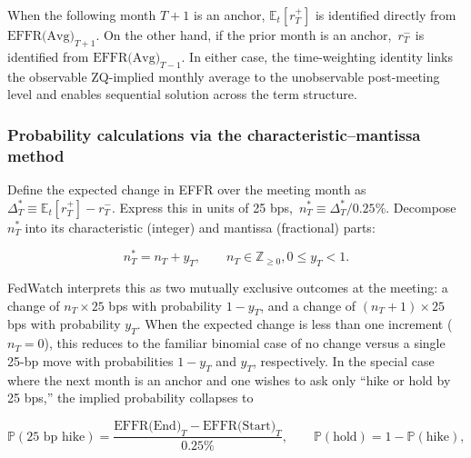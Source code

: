 When the following month $T{+}1$ is an anchor, $\mathbb{E}_t[r_T^{+}]$ is identified directly from $\text{EFFR(Avg)}_{T+1}$. On the other hand, if the prior month is an anchor, $\,r_T^{-}$ is identified from $\text{EFFR(Avg)}_{T-1}$. In either case, the time-weighting identity links the observable ZQ-implied monthly average to the unobservable post-meeting level and enables sequential solution across the term structure. 

\subsubsection{Probability calculations via the characteristic–mantissa method}

Define the expected change in EFFR over the meeting month as $\Delta_T^{*} \equiv \mathbb{E}_t[r_T^{+}] - r_T^{-}$. Express this in units of 25 bps, $\,n_T^{*} \equiv \Delta_T^{*}/0.25\%$. Decompose $n_T^{*}$ into its characteristic (integer) and mantissa (fractional) parts:

$$
n_T^{*} = n_T + y_T,\qquad n_T \in \mathbb{Z}_{\ge 0}, 0 \le y_T < 1.
$$

FedWatch interprets this as two mutually exclusive outcomes at the meeting: a change of $n_T \times 25$ bps with probability $1-y_T$, and a change of $(n_T{+}1)\times 25$ bps with probability $y_T$. When the expected change is less than one increment ($n_T=0$), this reduces to the familiar binomial case of no change versus a single 25-bp move with probabilities $1-y_T$ and $y_T$, respectively. In the special case where the next month is an anchor and one wishes to ask only “hike or hold by 25 bps,” the implied probability collapses to

$$
\mathbb{P}(\text{25 bp hike}) 
= \frac{\text{EFFR(End)}_{T}-\text{EFFR(Start)}_{T}}{0.25\%},
\qquad 
\mathbb{P}(\text{hold})=1-\mathbb{P}(\text{hike}),
$$

